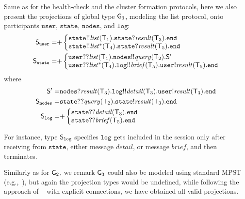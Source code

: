 Same as for the health-check and the cluster formation protocols, here we also present the projections of global type ${\sf G}_3$, modeling the list protocol, onto participants $\mathtt{user}$, $\mathtt{state}$, $\mathtt{nodes}$, and $\mathtt{log}$:
\begin{align*}
\ST_\mathtt{user} =& 
{+}
\left\{
\begin{array}{@{}l@{}}  
\mathtt{state}{!!}\mathit{list}(\T_1).\mathtt{state}{?}\mathit{result}(\T_3).\tend \\
\mathtt{state}{!!}\mathit{list^*}(\T_4).\mathtt{state}{?}\mathit{result}(\T_5).\tend 
\end{array} \right. \\
%
%
\ST_\mathtt{state} =&
{+}
\left\{
\begin{array}{@{}l@{}}  
\mathtt{user}{??}\mathit{list}(\T_1).\mathtt{nodes}{!!}\mathit{query}(\T_2).\ST'\\
\mathtt{user}{??}\mathit{list^*}(\T_4).\mathtt{log}{!!}\mathit{brief}(\T_5).\mathtt{user}{!}\mathit{result}(\T_5).\tend
\end{array} \right. 
\end{align*}
where
\begin{align*}
%
\ST'  =& 
\mathtt{nodes}{?}\mathit{result}(\T_3).\mathtt{log}{!!}\mathit{detail}(\T_3).\mathtt{user}{!}\mathit{result}(\T_3).\tend\\
%
%
\ST_\mathtt{nodes} = &
\mathtt{state}{??}\mathit{query}(\T_2).\mathtt{state}{!}\mathit{result}(\T_3).\tend \\
%
%
\ST_\mathtt{log} = & 
{+}
\left\{
\begin{array}{@{}l@{}}  
\mathtt{state}{??}\mathit{detail}(\T_3).\tend \\
\mathtt{state}{??}\mathit{brief}(\T_5).\tend \\
\end{array} \right.
\end{align*}

For instance, type ${\mathsf S}_\mathtt{log}$ specifies $\mathtt{log}$ gets included in the session only after receiving from $\mathtt{state}$, either message $\mathit{detail}$, or message $\mathit{brief}$, and then terminates. 

Similarly as for ${\sf G}_2$, we remark ${\sf G}_3$ could also be modeled using standard MPST (e.g.,~\cite{HondaYC08}), but again the projection types would be undefined, while following the approach of ~\cite{HuY17} with explicit connections, we have obtained all valid projections.
%
%
